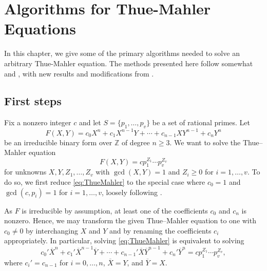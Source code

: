 \documentclass[11pt]{report}
\theoremstyle{definition}
\begin{document}
\chapter{Algorithms for Thue-Mahler Equations}
\label{ch:AlgorithmsForTM}

In this chapter, we give some of the primary algorithms needed to solve an arbitrary Thue-Mahler equation. The methods presented here follow somewhat \cite{Ham} and \cite{TW3}, with new results and modifications from \cite{GhKaMaSi}.


\section{First steps}
\label{sec:FirstSteps}

Fix a nonzero integer $c$ and let $S=\{p_1,\dotsc,p_v\}$ be a set of rational primes. Let
\[F(X,Y) = c_0 X^n + c_1 X^{n-1}Y + \cdots + c_{n-1}XY^{n-1} + c_nY^n\]
be an irreducible binary form over $\mathbb{Z}$ of degree $n \geq 3$. We want to solve the Thue--Mahler equation
\begin{equation} \label{eq:ThueMahler}
F(X,Y) = c p_1^{Z_1}\cdots p_v^{Z_v}
\end{equation}
for unknowns $X,Y, Z_1, \dots, Z_v$ with $\gcd(X,Y) = 1$ and $Z_i \geq 0$ for $i = 1,\dots, v$. To do so, we first reduce \eqref{eq:ThueMahler} to the special case where $c_0 = 1$ and $\gcd(c,p_i) = 1$ for $i = 1, \dots, v$, loosely following \cite{Ham}.

As $F$ is irreducible by assumption, at least one of the coefficients $c_0$ and $c_n$ is nonzero. Hence, we may transform the given Thue--Mahler equation to one with $c_0 \neq 0$ by interchanging $X$ and $Y$ and by renaming the coefficients $c_i$ appropriately. In particular, solving \eqref{eq:ThueMahler} is equivalent to solving
\[ c_0' \overline{X}^n + c_1' \overline{X}^{n-1}\overline{Y} + \cdots + c_{n-1}'\overline{X}\overline{Y}^{n-1} + c_n'\overline{Y}^n = c p_1^{Z_1}\cdots p_v^{Z_v},\]
where $c_i' = c_{n-1}$ for $i = 0, \dots, n$, $\overline{X} = Y$, and $\overline{Y} = X$.
\end{document}

